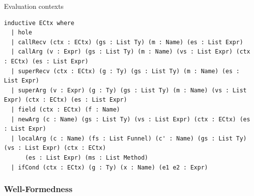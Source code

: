 \begin{cmp}{Evaluation contexts}
\begin{paperside}
\end{paperside}
\begin{leanside}
\begin{lstlisting}[style=leanside]
inductive ECtx where
  | hole
  | callRecv (ctx : ECtx) (gs : List Ty) (m : Name) (es : List Expr)
  | callArg (v : Expr) (gs : List Ty) (m : Name) (vs : List Expr) (ctx : ECtx) (es : List Expr)
  | superRecv (ctx : ECtx) (g : Ty) (gs : List Ty) (m : Name) (es : List Expr)
  | superArg (v : Expr) (g : Ty) (gs : List Ty) (m : Name) (vs : List Expr) (ctx : ECtx) (es : List Expr)
  | field (ctx : ECtx) (f : Name)
  | newArg (c : Name) (gs : List Ty) (vs : List Expr) (ctx : ECtx) (es : List Expr)
  | localArg (c : Name) (fs : List Funnel) (c' : Name) (gs : List Ty) (vs : List Expr) (ctx : ECtx)
      (es : List Expr) (ms : List Method)
  | ifCond (ctx : ECtx) (g : Ty) (x : Name) (e1 e2 : Expr)
\end{lstlisting}
\end{leanside}
\end{cmp}

\subsubsection{Well-Formedness}

